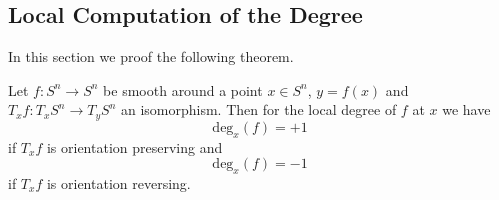 \subsection{Local Computation of the Degree}

In this section we proof the following theorem.

\begin{theorem}
    \label{alg_top:thm:local_degree}
    Let $f \colon S^n \to S^n$ be smooth around a point $x \in S^n$, $y = f(x)$ and $T_xf \colon T_xS^n \to T_yS^n$ an isomorphism. Then for the local degree of $f$ at $x$ we have 
    \[
    \mathrm{deg}_x(f) = +1
    \]
    if $T_xf$ is orientation preserving and 
    \[
    \mathrm{deg}_x(f) = -1
    \]
    if $T_xf$ is orientation reversing.
\end{theorem}

